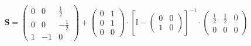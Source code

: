\documentclass[10pt]{article} \usepackage{amsmath} \usepackage{bbold}
\begin{document}
\[ \mathbf{S} = \left(\begin{smallmatrix} 0 & 0 & \frac{1}{2} \\ 0 & 0
& -\frac{1}{2} \\ 1 & -1 & 0 \end{smallmatrix}\right) +
\left(\begin{smallmatrix} 0 & 1 \\ 0 & 1 \\ 0 & 0
\end{smallmatrix}\right) \cdot \left[ \mathbb{I}  -
\left(\begin{smallmatrix} 0 & 0 \\ 1 & 0 \end{smallmatrix}\right)
\right]^{-1} \cdot\left(\begin{smallmatrix} \frac{1}{2} & \frac{1}{2}
& 0 \\ 0 & 0 & 0 \end{smallmatrix}\right) \]
\end{document}
